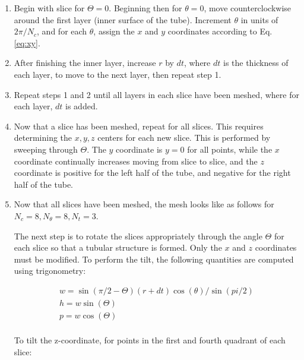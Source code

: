 \documentclass[10pt]{article}
\begin{document}
\begin{enumerate}
\item Begin with slice for \(\Theta=0\). Beginning then for \(\theta=0\), move counterclockwise around the first layer (inner surface of the tube). Increment \(\theta\) in units of \(2\pi/N_c\), and for each \(\theta\), assign the \(x\) and \(y\) coordinates according to Eq. \eqref{eq:xy}. 
\item After finishing the inner layer, increase \(r\) by \(dt\), where \(dt\) is the thickness of each layer, to move to the next layer, then repeat step 1. 
\item Repeat steps 1 and 2 until all layers in each slice have been meshed, where for each layer, \(dt\) is added. 
\item Now that a slice has been meshed, repeat for all slices. This requires determining the \(x,y,z\) centers for each new slice. This is performed by sweeping through \(\Theta\). The \(y\) coordinate is \(y=0\) for all points, while the \(x\) coordinate continually increases moving from slice to slice, and the \(z\) coordinate is positive for the left half of the tube, and negative for the right half of the tube. 
\item Now that all slices have been meshed, the mesh looks like as follows for \(N_c=8, N_\theta=8, N_t=3\). 
\begin{comment}
\begin{figure}[H]
  \centering
  \texttt{[image: NoTilt.jpg]}
  \caption{Mesh for \(N_c=8, N_\theta=8, N_t=3\) with no tilt to the slices. Lines connect each coordinate for better visuality.}
\end{figure}
\end{comment}
The next step is to rotate the slices appropriately through the angle \(\Theta\) for each slice so that a tubular structure is formed. Only the \(x\) and \(z\) coordinates must be modified. To perform the tilt, the following quantities are computed using trigonometry:

\begin{equation}
\begin{aligned}
w=\sin{(\pi/2-\Theta)}(r+dt)\cos{(\theta)}/\sin{(pi/2)}\\
h = w\sin{(\Theta)}\\
p = w\cos{(\Theta)}\\
\end{aligned}
\end{equation}

To tilt the z-coordinate, for points in the first and fourth quadrant of each slice:


\end{enumerate}
\end{document}
